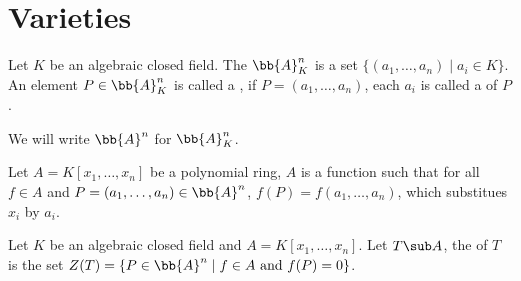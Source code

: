 \documentclass[10pt]{article}
\begin{document}
\def\htitle{Algebraic Geometry}
\def\hauthor{Hassium}
\hsetup
\htoc
\hmain
\section{Varieties}
\begin{definition}
    Let $K$ be an algebraic closed field. The  ${\bb{A}}_{K}^{n}$ is a set $\{({a}_{1},\dots,{a}_{n})\mid{a}_{i}\in K\}$. An element $P\in{\bb{A}}_{K}^{n}$ is called a , if $P=({a}_{1},\dots,{a}_{n})$, each ${a}_{i}$ is called a  of $P$.
\end{definition}
\begin{remark}
    We will write ${\bb{A}}^{n}$ for ${\bb{A}}_{K}^{n}$.
\end{remark}
\par
Let $A=K[{x}_{1},\dots,{x}_{n}]$ be a polynomial ring, $A$ is a function such that for all $f\in A$ and $P=({a}_{1},\dots,{a}_{n})\in{\bb{A}}^{n}$, $f(P)=f({a}_{1},\dots,{a}_{n})$, which substitues ${x}_{i}$ by ${a}_{i}$. 
\begin{definition}
    Let $K$ be an algebraic closed field and $A=K[{x}_{1},\dots,{x}_{n}]$. Let $T\sub A$, the  of $T$ is the set $Z(T)=\{P\in{\bb{A}}^{n}\mid f\in A\ \text{and}\ f(P)=0\}$.
\end{definition}










\hindex
\end{document}
